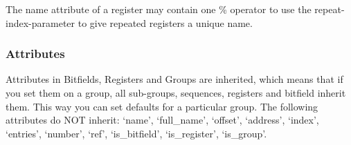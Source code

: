 \documentclass[letterpaper,10pt,english]{sphinxmanual}
\begin{document}
\begin{sphinxVerbatim}[commandchars=\\\{\}]
\end{sphinxVerbatim}

The name attribute of a register
may contain one \% operator to use the repeat-index-parameter to give repeated registers
a unique name.

\begin{sphinxVerbatim}[commandchars=\\\{\}]
      
       

      
\end{sphinxVerbatim}


\subsubsection{Attributes}
\label{\detokenize{user:attributes}}
Attributes in Bitfields, Registers and Groups are inherited, which means that
if you set them on a group, all sub-groups, sequences, registers and bitfield inherit them.
This way you can set defaults for a particular group.
The following attributes do NOT inherit: `name', `full\_name', `offset', `address',
`index', `entries', `number', `ref',
`is\_bitfield', `is\_register', `is\_group'.
\end{document}
